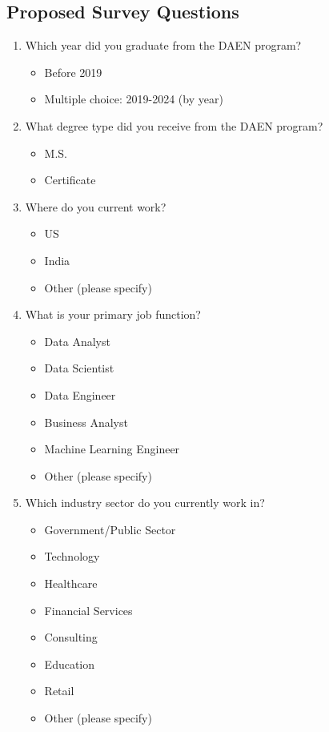 \documentclass[12pt,a4paper]{article}
\begin{document}
\subsection{Proposed Survey Questions}
\begin{enumerate}
\item Which year did you graduate from the DAEN program?
\begin{itemize}
    \item Before 2019
    \item Multiple choice: 2019-2024 (by year)
\end{itemize}

\item What degree type did you receive from the DAEN program?
\begin{itemize}
    \item M.S.
    \item Certificate
\end{itemize}

\item Where do you current work?
\begin{itemize}
    \item US
    \item India
    \item Other (please specify)
\end{itemize}

\item What is your primary job function?
\begin{itemize}
    \item Data Analyst
    \item Data Scientist
    \item Data Engineer
    \item Business Analyst
    \item Machine Learning Engineer
    \item Other (please specify)
\end{itemize}

\item Which industry sector do you currently work in?
\begin{itemize}
    \item Government/Public Sector
    \item Technology
    \item Healthcare
    \item Financial Services
    \item Consulting
    \item Education
    \item Retail
    \item Other (please specify)
\end{itemize}


\end{enumerate}
\end{document}
